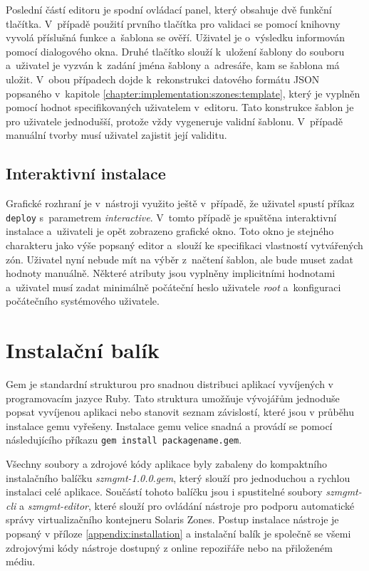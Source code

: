 Poslední částí editoru je spodní ovládací panel, který obsahuje dvě funkční tlačítka. V~případě použití prvního tlačítka
pro validaci se pomocí knihovny vyvolá příslušná funkce a~šablona se ověří. Uživatel je o~výsledku informován pomocí dialogového
okna. Druhé tlačítko slouží k~uložení šablony do souboru a~uživatel je vyzván k~zadání jména šablony a~adresáře, kam se šablona má uložit.
V~obou případech dojde k~rekonstrukci datového formátu JSON popsaného v~kapitole \ref{chapter:implementation:szones:template},
který je vyplněn pomocí hodnot specifikovaných uživatelem v~editoru. Tato konstrukce šablon je pro uživatele jednodušší, protože
vždy vygeneruje validní šablonu. V~případě manuální tvorby musí uživatel zajistit její validitu.
\subsection{Interaktivní instalace}
\label{chapter:implementation:gui:interactive}
Grafické rozhraní je v~nástroji využito ještě v~případě, že uživatel spustí příkaz \verb|deploy| s~parametrem \textit{interactive}.
V~tomto případě je spuštěna interaktivní instalace a~uživateli je opět zobrazeno grafické okno. Toto okno je stejného charakteru
jako výše popsaný editor a~slouží ke specifikaci vlastností vytvářených zón. Uživatel nyní nebude mít na výběr z~načtení šablon, ale bude muset
zadat hodnoty manuálně. Některé atributy jsou vyplněny implicitními hodnotami a~uživatel musí zadat minimálně počáteční heslo 
uživatele \textit{root} a~konfiguraci počátečního systémového uživatele.
\section{Instalační balík}
\label{chapter:implementation:package}
Gem je standardní strukturou pro snadnou distribuci aplikací vyvíjených v programovacím jazyce Ruby. Tato struktura umožňuje vývojářům
jednoduše popsat vyvíjenou aplikaci nebo stanovit seznam závislostí, které jsou v průběhu instalace gemu vyřešeny. Instalace gemu
velice snadná a provádí se pomocí následujícího příkazu \texttt{gem install packagename.gem}.

Všechny soubory a zdrojové kódy aplikace byly zabaleny do kompaktního instalačního balíčku \textit{szmgmt-1.0.0.gem}, který
slouží pro jednoduchou a rychlou instalaci celé aplikace.  Součástí tohoto balíčku jsou i spustitelné soubory \textit{szmgmt-cli} a
\textit{szmgmt-editor}, které slouží pro ovládání nástroje pro podporu automatické správy virtualizačního kontejneru Solaris Zones.
Postup instalace nástroje je popsaný v příloze \ref{appendix:installation} a instalační balík je společně se všemi zdrojovými kódy
nástroje dostupný z online repoziřáře \cite{tool:repository} nebo na přiloženém médiu.